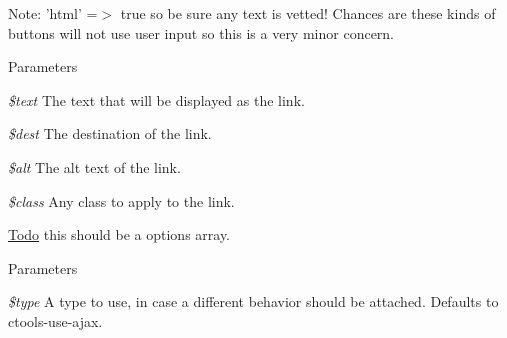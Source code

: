 Note: 'html' =$>$ true so be sure any text is vetted! Chances are these kinds of buttons will not use user input so this is a very minor concern.


\begin{DoxyParams}{Parameters}
\item[{\em \$text}]The text that will be displayed as the link. \item[{\em \$dest}]The destination of the link. \item[{\em \$alt}]The alt text of the link. \item[{\em \$class}]Any class to apply to the link. \end{DoxyParams}
\begin{Desc}
\item[\hyperlink{todo__todo000033}{Todo}]this should be a options array. \end{Desc}

\begin{DoxyParams}{Parameters}
\item[{\em \$type}]A type to use, in case a different behavior should be attached. Defaults to ctools-\/use-\/ajax. \end{DoxyParams}
